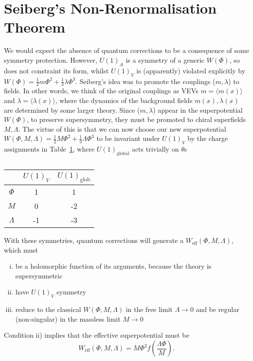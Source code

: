 \section{Seiberg's Non-Renormalisation Theorem}%
\label{sec:seiberg_s_non_renormalisation_theorem}

We would expect the absence of quantum corrections to be a consequence of some symmetry protection. However, $U(1)_A$ is a symmetry of a generic $W(\Phi)$, so does not constraint its form, whilst $U(1)_V$ is (apparently) violated explicitly by $W(\Phi) = \frac{1}{2} m \Phi^2 + \frac{1}{3} \lambda \Phi^3$.
Seiberg's idea was to promote the couplings ($m, \lambda$) to fields. In other words, we think of the original couplings as VEVs $m = \langle m(x) \rangle$ and $\lambda = \langle \lambda(x) \rangle$, where the dynamics of the background fields $m(x), \lambda(x)$ are determined by some larger theory.
Since ($m, \lambda$) appear in the superpotential $W(\Phi)$, to preserve supersymmetry, they must be promoted to chiral superfields $M, \Lambda$. The virtue of this is that we can now choose our new superpotential $W(\Phi, M, \Lambda) = \frac{1}{2} M \Phi^2 + \frac{1}{3} \Lambda \Phi^3$ to be invariant under $U(1)_V$ by the charge assignments in Table~\ref{tab:l14t1}, where $U(1)_{\text{global}}$ acts trivially on $\theta$s
\begin{table}[htpb]
  \centering
  \begin{tabular}{c | c c}
     & $U(1)_V$ & $U(1)_{\text{glob}}$ \\
     \hline
    $\Phi$ & 1 & 1 \\
    $M$ & 0 & -2 \\
    $\Lambda$ & -1 & -3 \\
  \end{tabular}
  \caption{}
  \label{tab:l14t1}
\end{table}
With these symmetries, quantum corrections will generate a $W_{\text{eff}}(\Phi, M, \Lambda)$, which must
\begin{enumerate}[i)]
  \item be a holomorphic function of its arguments, because the theory is supersymmetric
  \item have $U(1)_V$ symmetry
  \item reduce to the classical $W(\Phi, M, \Lambda)$ in the free limit $\Lambda \to 0$ and be regular (non-singular) in the massless limit $M \to 0$
\end{enumerate}
Condition ii) implies that the effective superpotential must be
\begin{equation}
  W_{\text{eff}}(\Phi, M, \Lambda) = M \Phi^2 f(\frac{\Lambda \Phi}{M}).
\end{equation}
